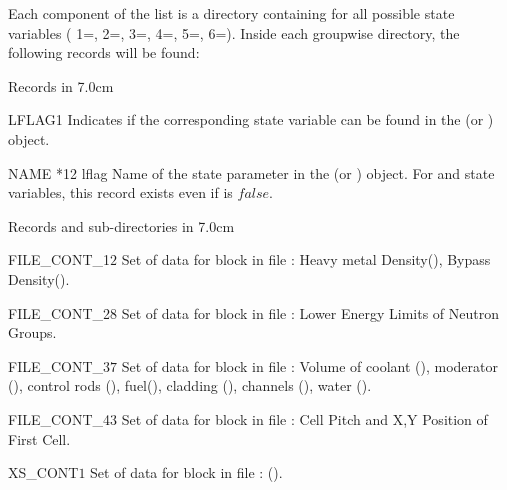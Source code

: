 Each component of the list  is a directory containing for all possible state variables ( 1=, 2=, 3=, 4=, 5=, 6=). Inside each groupwise directory, the following records will be found:

 \begin{DescriptionEnregistrement}{Records in  }{7.0cm} \label{tabl:tabPK}
 
 \IntEnr
 {LFLAG}{1}
 {Indicates if the corresponding state variable can be found in the  (or ) object.}
  
  \OptCharEnr
 {NAME} {*12} {lflag} 
 {Name of the state parameter in the  (or ) object. For  and  state variables, this record exists even if  is $\textit{false}$. }  
 
   
 \end{DescriptionEnregistrement} 
 


\begin{DescriptionEnregistrement}{Records and sub-directories
 in  }{7.0cm} \label{tabl:tabhel}

\RealEnr
 {FILE\_CONT\_1}{$2$}{ }
 {Set of data for  block in  file : Heavy metal Density(), Bypass Density(). } 
  
\RealEnr
 {FILE\_CONT\_2}{$8$}{ }
 {Set of data for  block in  file : Lower Energy Limits of Neutron Groups. } 
  
\RealEnr
 {FILE\_CONT\_3}{$7$}{ }
 {Set of data for  block in  file : Volume of coolant (), moderator (), control rods (), fuel(), cladding (), channels (), water (). }
 
 \RealEnr
 {FILE\_CONT\_4}{$3$}{ }
 {Set of data for  block in  file : Cell Pitch and X,Y Position of First Cell. }
 
  \RealEnr
 {XS\_CONT}{$1$}{ }
 {Set of data for  block in  file :  (). }
    
 \end{DescriptionEnregistrement}
 
